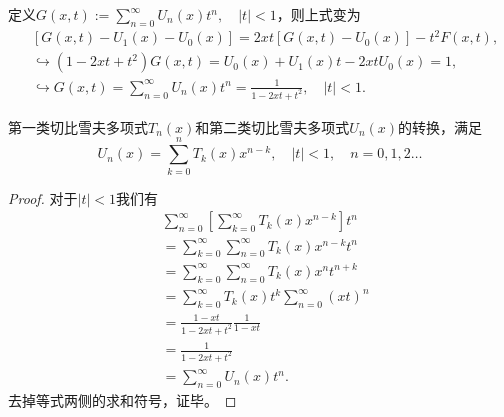 \begin{subappendices}
定义$G(x,t):= \sum_{n=0}^{\infty} U_n(x) t^n, \quad \left| t \right| < 1$，则上式变为
\begin{equation*}
  \begin{split}
    &\left[ G(x,t) - U_1(x) - U_0 (x) \right] = 2 x t \left[ G(x,t) - U_0(x) \right] - t^2 F(x,t),\\
    & \hookrightarrow (1-2xt+t^2) G(x,t) = U_0(x) + U_1(x) t - 2x t U_0(x) = 1, \\
    & \hookrightarrow G(x,t) = \sum_{n=0}^{\infty} U_n(x) t^n = \frac{1}{1 - 2xt + t^2}, \quad \left| t \right| < 1.
\end{split}
\end{equation*}

\begin{theorem}[第一类和第二类切比雪夫多项式的转换]
  第一类切比雪夫多项式$T_n(x)$和第二类切比雪夫多项式$U_n(x)$的转换，满足
  \begin{equation}
    \label{eq:poly-chebyshev-1-2-transformation}
    U_n(x) = \sum_{k=0}^{n} T_k(x) x^{n-k}, \quad \left| t \right| <1, \quad n=0,1,2 \ldots
  \end{equation}
\end{theorem}
\begin{proof}
对于$\left| t \right| <1$我们有
\begin{equation*}
  \begin{split}
    & \sum_{n=0}^{\infty} \left[ \sum_{k=0}^{\infty} T_k(x) x^{n-k} \right] t^n \\
    &=\sum_{k=0}^{\infty} \sum_{n=0}^{\infty} T_k(x) x^{n-k} t^n \\
    &=\sum_{k=0}^{\infty} \sum_{n=0}^{\infty} T_k(x) x^n t^{n+k}\\
    &=\sum_{k=0}^{\infty} T_k(x) t^k \sum_{n=0}^{\infty} (xt)^n \\
    &= \frac{1-xt}{1-2xt+t^2} \frac{1}{1-xt} \\
    &= \frac{1}{1-2xt + t^2} \\
    &=\sum_{n=0}^{\infty} U_n(x) t^n.
  \end{split}
\end{equation*}
去掉等式两侧的求和符号，证毕。
\end{proof}


\end{subappendices}
